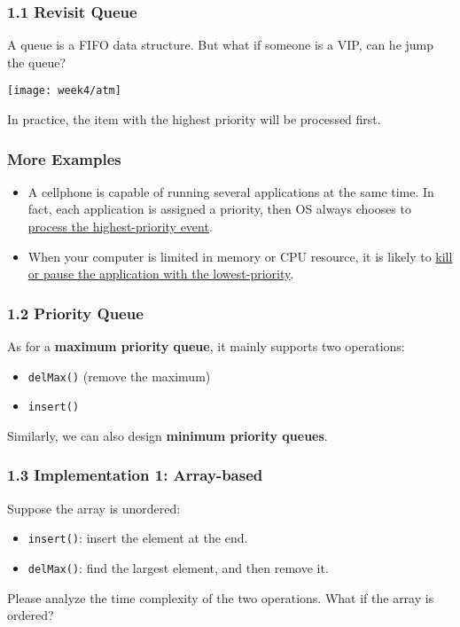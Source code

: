 \documentclass[aspectratio=169, 14pt]{beamer}
\begin{document}
\begin{frame}
	\frametitle{1.1 Revisit Queue}
	A queue is a FIFO data structure. But what if someone is a VIP, can he jump the queue?

	\begin{center}
		\texttt{[image: week4/atm]}
	\end{center}
	In practice, the item with the highest \alert{priority} will be processed first.
\end{frame}

\begin{frame}
	\frametitle{More Examples}

	\begin{itemize}
		\item {} A cellphone is capable of running several applications at the same time. In fact, each application is assigned a priority, then OS always chooses to \underline{process the highest-priority event}.
		\item {} When your computer is limited in memory or CPU resource, it is likely to \underline{kill or pause the application with the lowest-priority}.
	\end{itemize}

\end{frame}

\begin{frame}[fragile]
	\frametitle{1.2 Priority Queue}
	As for a \textbf{maximum priority queue}, it mainly supports two operations:

	\begin{itemize}
		\item \texttt{delMax()} (remove the maximum)
		\item \texttt{insert()}
	\end{itemize}


	Similarly, we can also design \textbf{minimum priority queues}.
\end{frame}

\begin{frame}
	\frametitle{1.3 Implementation 1: Array-based}
	Suppose the array is unordered:

	\begin{itemize}
		\item \texttt{insert()}: insert the element at the end.
		\item \texttt{delMax()}: find the largest element, and then remove it.
	\end{itemize}

	 Please analyze the time complexity of the two operations. What if the array is ordered?

\end{frame}
\end{document}
